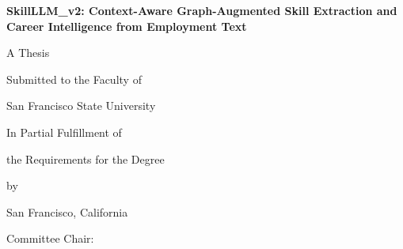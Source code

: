 \begin{titlepage}
  \centering
  {\large \thesisuniversity\par}
  \vspace{0.5cm}
  {\large \thesisdepartment\par}
  \vspace{2cm}
  {\LARGE\bfseries SkillLLM\_v2: Context-Aware Graph-Augmented Skill Extraction and Career Intelligence from Employment Text\par}
  \vspace{2cm}
  {\large A Thesis\par}
  {\large Submitted to the Faculty of\par}
  {\large San Francisco State University\par}
  {\large In Partial Fulfillment of\par}
  {\large the Requirements for the Degree\par}
  \vspace{0.5cm}
  {\large \thesisdegree\par}
  \vspace{2cm}
  {\large by\par}
  \vspace{0.5cm}
  {\large \thesisauthor\par}
  \vspace{1cm}
  {\large San Francisco, California\par}
  \vspace{0.5cm}
  {\large \thesissubmissiondate\par}
  \vfill
  {\large Committee Chair: \thesisadvisor\par}
\end{titlepage}

\newpage
\thispagestyle{empty}
\mbox{}
